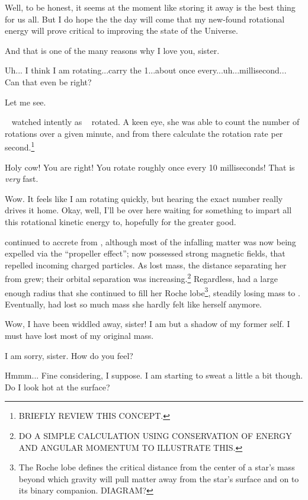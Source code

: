 \documentclass[main.tex]{subfiles}
\begin{document}
\newpara \Merope  Well, to be honest, it seems at the moment like storing it away is the best thing for us all.  But I do hope the the day will come that my new-found rotational energy will prove critical to improving the state of the Universe.

\newpara \Maia And that is one of the many reasons why I love you, sister.  

\newpara \Merope Uh... I think I am rotating...carry the 1...about once every...uh...millisecond... Can that even be right?

\newpara \Maia Let me see.

\newpara \nar \rmmaia~ watched intently as \rmmerope~ rotated.  A keen eye, she was able to count the number of rotations over a given minute, and from there calculate the rotation rate per second.\footnote{BRIEFLY REVIEW THIS CONCEPT.}

\newpara \Maia Holy cow!  You are right! You rotate roughly once every 10 milliseconds!  That is \textit{very} fast.  

\newpara \Merope Wow.  It feels like I am rotating quickly, but hearing the exact number really drives it home.  Okay, well, I'll be over here waiting for something to impart all this rotational kinetic energy to, hopefully for the greater good. 

\newpara \nar \rmmerope continued to accrete from \rmmaia, although most of the infalling matter was now being expelled via the ``propeller effect''; \rmmerope now possessed strong magnetic fields, that repelled incoming charged particles.  As \rmmaia lost mass, the distance separating her from \rmmerope grew; their orbital separation was increasing.\footnote{DO A SIMPLE CALCULATION USING CONSERVATION OF ENERGY AND ANGULAR MOMENTUM TO ILLUSTRATE THIS.}  Regardless, \rmmaia had a large enough radius that she continued to fill her Roche lobe\footnote{The Roche lobe defines the critical distance from the center of a star's mass beyond which gravity will pull matter away from the star's surface and on to its binary companion. DIAGRAM?}, steadily losing mass to \rmmerope.  Eventually, \rmmaia had lost so much mass she hardly felt like herself anymore.

\newpara \Maia Wow, I have been widdled away, sister!  I am but a shadow of my former self.  I must have lost most of my original mass.  

\newpara \Merope I am sorry, sister.  How do you feel?

\newpara \Maia Hmmm... Fine considering, I suppose.  I am starting to sweat a little a bit though.  Do I look hot at the surface?
\end{document}
